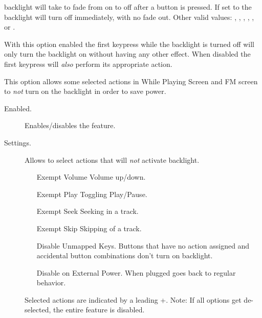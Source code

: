 \begin{description}
\begin{description}
{{        backlight will take to fade from on to off after a button is pressed. If
        set to  the backlight will turn off immediately, with no
        fade out. Other valid values: , ,
        , , ,  or
        .
      }
      \item[First Keypress Enables Backlight Only.]
      With this option enabled the first keypress while the backlight is turned
      off will only turn the backlight on without having any other effect. When
      disabled the first keypress will \emph{also} perform its appropriate action.

      \item[\label{ref:selectivebacklight}Backlight Exemptions]
       This option allows some selected actions in While Playing Screen and
       FM screen to \emph{not} turn on the backlight in order to save power.
      \begin{description}
        \item[Enabled.]
        Enables/disables the feature.

        \item[Settings.]
        Allows to select actions that will \emph{not} activate backlight.
                \begin{itemize}
                \item[Exempt Volume]
                Volume up/down.
                \item[Exempt Play]
                Toggling Play/Pause.
                \item[Exempt Seek]
                Seeking in a track.
                \item[Exempt Skip]
                Skipping of a track.
                \item[Disable Unmapped Keys.]
                Buttons that have no action assigned and accidental button
                    combinations don't turn on backlight.
                \item[Disable on External Power.]
                When plugged goes back to regular behavior.
                \end{itemize}
        Selected actions are indicated by a leading +.
        Note: If all options get de-selected, the entire feature is disabled.
        \end{description}



}
\end{description}
\end{description}
